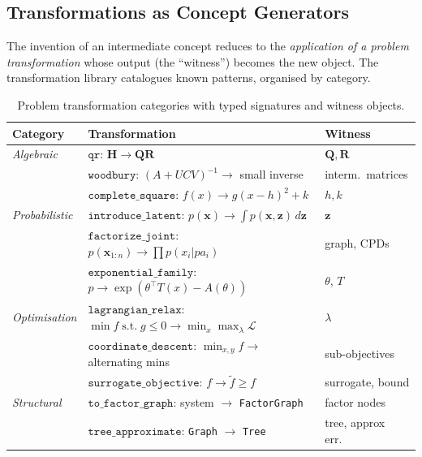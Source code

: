 \documentclass[12pt,a4paper]{article}
\newcommand{\bH}{\mathbf{H}}
\newcommand{\bx}{\mathbf{x}}
\begin{document}
\subsection{Transformations as Concept Generators}

The invention of an intermediate concept reduces to the \emph{application of a
problem transformation} whose output (the ``witness'') becomes the new object.
The transformation library catalogues known patterns, organised by category.

\begin{table}[H]
  \centering
  \caption{Problem transformation categories with typed signatures and witness objects.}
  \label{tab:transforms}
  \small
  \begin{tabular}{@{}p{2.6cm}p{7.8cm}p{2.6cm}@{}}
    \toprule
    \textbf{Category} & \textbf{Transformation} & \textbf{Witness} \\
    \midrule
    \textit{Algebraic} &
      $\mathtt{qr}$: $\bH \to \mathbf{Q}\mathbf{R}$ & $\mathbf{Q},\mathbf{R}$ \\
    &  $\mathtt{woodbury}$: $(A+UCV)^{-1}\to$ small inverse & interm.\ matrices \\
    &  $\mathtt{complete\_square}$: $f(x)\to g(x-h)^2+k$ & $h,k$ \\
    \midrule
    \textit{Probabilistic} &
      $\mathtt{introduce\_latent}$: $p(\bx)\to\int p(\bx,\mathbf{z})\,d\mathbf{z}$ & $\mathbf{z}$ \\
    &  $\mathtt{factorize\_joint}$: $p(\bx_{1:n})\to\prod p(x_i|pa_i)$ & graph, CPDs \\
    &  $\mathtt{exponential\_family}$: $p\to\exp(\theta^\top T(x)-A(\theta))$ & $\theta$, $T$ \\
    \midrule
    \textit{Optimisation} &
      $\mathtt{lagrangian\_relax}$: $\min f\;\mathrm{s.t.}\; g\le 0 \to \min_x\max_\lambda\mathcal{L}$ & $\lambda$ \\
    &  $\mathtt{coordinate\_descent}$: $\min_{x,y}f\to$ alternating mins & sub-objectives \\
    &  $\mathtt{surrogate\_objective}$: $f\to\tilde{f}\ge f$ & surrogate, bound \\
    \midrule
    \textit{Structural} &
      $\mathtt{to\_factor\_graph}$: system $\to$ \texttt{FactorGraph} & factor nodes \\
    &  $\mathtt{tree\_approximate}$: \texttt{Graph} $\to$ \texttt{Tree} & tree, approx err.\ \\
    \bottomrule
  \end{tabular}
\end{table}
\end{document}
